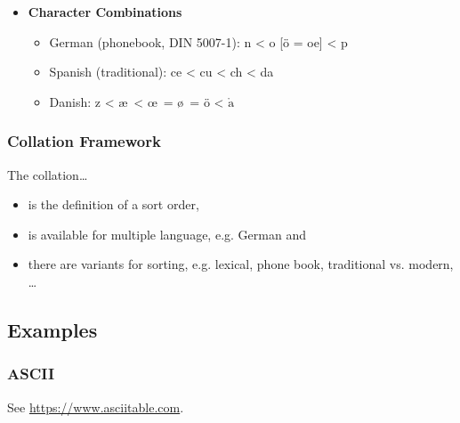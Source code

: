 \documentclass[a4paper, 11pt, accentcolor = tud3b]{tudreport}
\providecommand{\HREF}[1]{\href{#1}{#1}}
\begin{document}
\begin{itemize}
\begin{itemize}
                    			\item e < {\'e} < f vs. e = {\'e} < f
                    			\item French: c{\^o}te < cot{\'e}
                    			\item English: cot{\'e} < c{\^o}te
                    		\end{itemize}
                    	\item \textbf{Character Combinations}
                    		\begin{itemize}
                    			\item German (phonebook, DIN 5007-1): n < o [ö = oe] < p
                    			\item Spanish (traditional): ce < cu < ch < da
                    			\item Danish: z < \ae \, < \! \oe \, = \o \, = ö < \(\mathring{\text{a}}\)
                    		\end{itemize}
                    \end{itemize}

                \subsubsection{Collation Framework} %
                	The collation\dots
                    \begin{itemize}
                    	\item is the definition of a sort order,
                    	\item is available for multiple language, e.g. German and
                    	\item there are variants for sorting, e.g. lexical, phone book, traditional vs. modern, \dots
                    \end{itemize}

            \subsection{Examples} %
                \subsubsection{ASCII} %
                    See \HREF{https://www.asciitable.com}.
\end{document}
